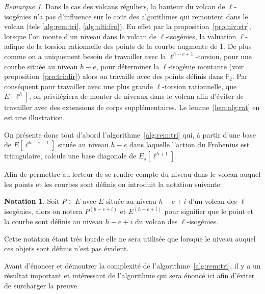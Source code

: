 \documentclass[10pt,a4paper]{book}
\theoremstyle{plain}
\theoremstyle{definition}
\theoremstyle{definition}
\theoremstyle{definition}
\theoremstyle{definition}
\theoremstyle{definition}
\theoremstyle{remark}
\newtheorem{rem}[thm]{Remarque}
\theoremstyle{remark}
\theoremstyle{definition}
\newtheorem{nota}[thm]{Notation}
\begin{document}
\begin{rem}
\label{rem:rat:niv:vol}
Dans le cas des volcans réguliers, la hauteur du volcan de $\ell$-isogénies 
n'a pas d'influence sur le coût des algorithmes qui remontent dans le volcan 
(tels \ref{alg:rem:tri}, \ref{alg:ulti:fro}). En effet par la 
proposition~\ref{pro:niv:str}, lorsque l'on monte d'un niveau dans
le volcan de $\ell$-isogénies, la valuation $\ell$-adique de la torsion
rationnelle des points de la courbe augmente de $1$. De plus comme on a 
uniquement besoin de travailler avec la $\ell^{h-e+1}$-torsion, pour une courbe 
située au niveau $h-e$, pour déterminer la $\ell$-isogénie montante (voir 
proposition~\ref{pro:tri:dir}) alors on travaille avec des points définis dans 
$\mathsf{F}_2$. Par conséquent pour travailler avec
une plus grande $\ell$-torsion rationnelle, que $E[\ell^h]$, on privilégiera 
de monter de niveaux dans le volcan afin d'éviter de travailler avec des 
extensions de corps supplémentaires. Le lemme~\ref{lem:alg:rat} en est une illustration.
\end{rem}


On présente donc tout d'abord l'algorithme~\ref{alg:rem:tri} 
qui, à partir d'une base de $E[\ell^{h-e+1}]$ située au niveau $h-e$ dans 
laquelle l'action du Frobenius est triangulaire, calcule une base diagonale de 
$E_s[\ell^{h+1}]$.

Afin de permettre au lecteur de se rendre compte du niveau dans le volcan 
auquel les points et les courbes sont définis on introduit la notation suivante:
\begin{nota}
Soit $P \in E$ avec $E$ située au niveau $h-e+i$ d'un volcan des 
$\ell$-isogénies, alors on notera $P^{(h-e+i)}$ et $E^{(h-e+i)}$ pour signifier
que le point et la courbe sont définis au niveau $h-e+i$ du volcan des 
$\ell$-isogénies.
\end{nota}
Cette notation étant très lourde elle ne sera utilisée que lorsque le niveau 
auquel ces objets sont définis n'est pas évident.

Avant d'énoncer et démontrer la complexité de l'algorithme~\ref{alg:rem:tri}, 
il y a un résultat important et intéressant de l'algorithme qui sera énoncé ici
afin d'éviter de surcharger la preuve.
\end{document}
